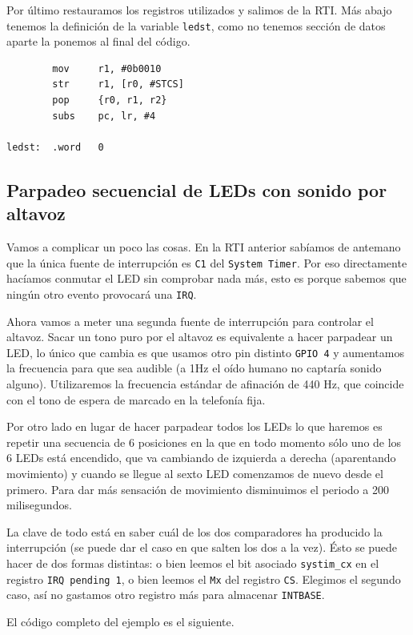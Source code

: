 Por último restauramos los registros utilizados y salimos de la RTI. Más abajo tenemos la
definición de la variable {\tt ledst}, como no tenemos sección de datos aparte la ponemos
al final del código.

\begin{lstlisting}
        mov     r1, #0b0010
        str     r1, [r0, #STCS]
        pop     {r0, r1, r2}
        subs    pc, lr, #4

ledst:  .word   0
\end{lstlisting}

\subsection{Parpadeo secuencial de LEDs con sonido por altavoz}

Vamos a complicar un poco las cosas. En la RTI anterior sabíamos de antemano que la única fuente
de interrupción es {\tt C1} del {\tt System Timer}. Por eso directamente hacíamos conmutar el
LED sin comprobar nada más, esto es porque sabemos que ningún otro evento provocará una {\tt IRQ}.

Ahora vamos a meter una segunda fuente de interrupción para controlar el altavoz. Sacar un tono
puro por el altavoz es equivalente a hacer parpadear un LED, lo único que cambia es que usamos
otro pin distinto {\tt GPIO 4} y aumentamos la frecuencia para que sea audible (a 1Hz el oído
humano no captaría sonido alguno). Utilizaremos la frecuencia estándar de afinación
de 440 Hz, que coincide con el tono de espera de marcado en la telefonía fija.

Por otro lado en lugar de hacer parpadear todos los LEDs lo que haremos es repetir una
secuencia de 6 posiciones en la que en todo momento sólo uno de los 6 LEDs está encendido, que
va cambiando de izquierda a derecha (aparentando movimiento) y cuando se llegue al sexto LED
comenzamos de nuevo desde el primero. Para dar más sensación de movimiento disminuimos el periodo
a 200 milisegundos.

La clave de todo está en saber cuál de los dos comparadores ha producido la interrupción (se
puede dar el caso en que salten los dos a la vez). Ésto se puede hacer de dos formas distintas:
o bien leemos el bit asociado {\tt systim\_cx} en el registro {\tt IRQ pending 1}, o bien leemos
el {\tt Mx} del registro {\tt CS}. Elegimos el segundo caso, así no gastamos otro registro más
para almacenar {\tt INTBASE}.

El código completo del ejemplo es el siguiente.

